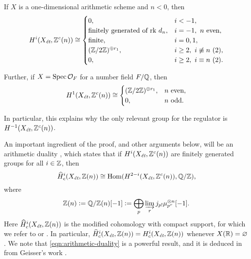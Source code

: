 \documentclass{article}
\numberwithin{equation}{section}
\begin{document}
\begin{proposition}
  \label{prop:structure-of-motivic-cohomology}
  If $X$ is a one-dimensional arithmetic scheme and $n < 0$, then
  \begin{equation}
    \label{eqn:structure-of-motivic-cohomology}
    H^i (X_\et, \ZZ^c (n)) \cong
    \begin{cases}
      0, & i < -1, \\
      \text{finitely generated of rk } d_n, & i = -1, ~ n\text{ even}, \\
      \text{finite}, & i = 0,1, \\
      (\ZZ/2\ZZ)^{\oplus r_1}, & i \ge 2, ~ i\not\equiv n ~ (2), \\
      0, & i \ge 2, ~ i\equiv n ~ (2).
    \end{cases}
  \end{equation}

  Further, if $X = \Spec \mathcal{O}_F$ for a number field $F/\QQ$, then
  \begin{equation}
    \label{eqn:2-torsion-in-H1-Zc-for-Spec-OF}
    H^1 (X_\et, \ZZ^c (n)) \cong
    \begin{cases}
      (\ZZ/2\ZZ)^{\oplus r_1}, & n\text{ even}, \\
      0, & n \text{ odd}.
    \end{cases}
  \end{equation}
\end{proposition}

In particular, this explains why the only relevant group for the regulator is
$H^{-1} (X_\et, \ZZ^c (n))$.

An important ingredient of the proof, and other arguments below, will be an
arithmetic duality \cite[Theorem~I]{Beshenov-Weil-etale-1}, which states that if
$H^i (X_\et, \ZZ^c (n))$ are finitely generated groups for all $i \in \ZZ$, then
\begin{equation}
  \label{eqn:arithmetic-duality}
  \widehat{H}^i_c (X_\et, \ZZ (n)) \cong
  \Hom (H^{2-i} (X_\et, \ZZ^c (n)), \QQ/\ZZ),
\end{equation}
where
\[ \ZZ (n) \dfn \QQ/\ZZ (n) [-1] \dfn
  \bigoplus_p \varinjlim_r j_{p!} \mu_{p^r}^{\otimes n} [-1]. \]
Here $\widehat{H}^i_c (X_\et, \ZZ (n))$ is the modified cohomology with compact
support, for which we refer to \cite[Appendix~B]{Beshenov-Weil-etale-1} or
\cite[\S 2]{Geisser-Schmidt-2018}. In particular,
$\widehat{H}^i_c (X_\et, \ZZ (n)) = H^i_c (X_\et, \ZZ (n))$ whenever
$X (\RR) = \emptyset$.
We note that \eqref{eqn:arithmetic-duality} is a powerful result, and it is
deduced in \cite{Beshenov-Weil-etale-1} from Geisser's work \cite{Geisser-2010}.
\end{document}
